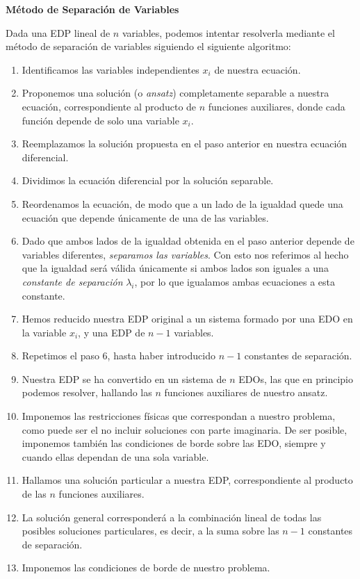 \begin{propo} 
    \textbf{Método de Separación de Variables} \par

    Dada una EDP lineal de $n$ variables, podemos intentar resolverla mediante el método de separación de variables siguiendo el siguiente algoritmo:
    \begin{enumerate}
        \item Identificamos las variables independientes $x_i$ de nuestra ecuación.
        \item Proponemos una solución (o \emph{ansatz}) completamente separable a nuestra ecuación, correspondiente al producto de $n$ funciones auxiliares, donde cada función depende de solo una variable $x_i$.
        \item Reemplazamos la solución propuesta en el paso anterior en nuestra ecuación diferencial.
        \item Dividimos la ecuación diferencial por la solución separable.
        \item  Reordenamos la ecuación, de modo que a un lado de la igualdad quede una ecuación que depende únicamente de una de las variables.
        \item Dado que ambos lados de la igualdad obtenida en el paso anterior depende de variables diferentes, \emph{separamos las variables}. Con esto nos referimos al hecho que la igualdad será válida únicamente si ambos lados son iguales a una \emph{constante de separación} $\lambda_i$, por lo que igualamos ambas ecuaciones a esta constante.
        \item Hemos reducido nuestra EDP original a un sistema formado por una EDO en la variable $x_i$, y una EDP de $n-1$ variables.
        \item Repetimos el paso 6, hasta haber introducido $n-1$ constantes de separación.
        \item Nuestra EDP se ha convertido en un sistema de $n$ EDOs, las que en principio podemos resolver, hallando las $n$ funciones auxiliares de nuestro ansatz.
        \item Imponemos las restricciones físicas que correspondan a nuestro problema, como puede ser el no incluir soluciones con parte imaginaria. De ser posible, imponemos también las condiciones de borde sobre las EDO, siempre y cuando ellas dependan de una sola variable. 
        \item Hallamos una solución particular a nuestra EDP, correspondiente al producto de las $n$ funciones auxiliares.
        \item La solución general corresponderá a la combinación lineal de todas las posibles soluciones particulares, es decir, a la suma sobre las $n-1$ constantes de separación.
        \item Imponemos las condiciones de borde de nuestro problema.
    \end{enumerate}
\end{propo}

